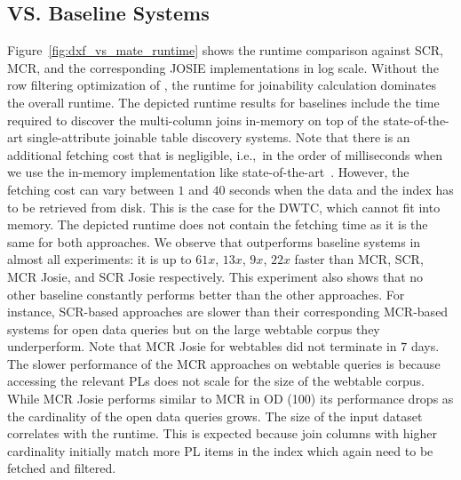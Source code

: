 \subsection{\system VS. Baseline Systems}

Figure~\ref{fig:dxf_vs_mate_runtime} shows the runtime comparison \system against SCR, MCR, and the corresponding JOSIE implementations in log scale.
Without the row filtering optimization of \system, the runtime for joinability calculation dominates the overall runtime.
The depicted runtime results for baselines include the time required to discover the multi-column joins in-memory on top of the state-of-the-art single-attribute joinable table discovery systems. 
Note that there is an additional fetching cost that is negligible, i.e.,~in the order of milliseconds when we use the in-memory implementation like state-of-the-art~\cite{zhu2019josie}. However, the fetching cost can vary between $1$ and $40$ seconds when the data and the index has to be retrieved from disk. This is the case for the DWTC, which cannot fit into memory. The depicted runtime does not contain the fetching time as it is the same for both approaches.
We observe that \system outperforms baseline systems in almost all experiments: it is up to $61x$, $13x$, $9x$, $22x$ faster than MCR, SCR, MCR Josie, and SCR Josie respectively.
This experiment also shows that no other baseline constantly performs better than the other approaches. For instance, SCR-based approaches are slower than their corresponding MCR-based systems for open data queries but on the large webtable corpus they underperform. Note that MCR Josie for webtables did not terminate in $7$ days. The slower performance of the MCR approaches on webtable queries is because accessing the relevant PLs does not scale for the size of the webtable corpus. While MCR Josie performs similar to MCR in OD (100) its performance drops as the cardinality of the open data queries grows.
The size of the input dataset correlates with the runtime. This is expected because join columns with higher cardinality initially match more PL items in the index which again need to be fetched and filtered. 

